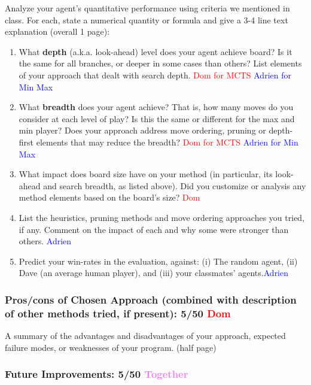 \documentclass[12pt, letterpaper]{article}
\begin{document}
        Analyze your agent's quantitative performance using  criteria we mentioned in class. For each, state a numerical quantity or formula and give a 3-4 line text explanation (overall 1 page):
        \begin{enumerate}
            \item What \textbf{depth} (a.k.a. look-ahead) level does your agent achieve  board? Is it the same for all branches, or deeper in some cases than others? List elements of your approach that dealt with search depth.  \textcolor{red}{Dom for MCTS} \textcolor{blue}{Adrien for Min Max}
            \item What \textbf{breadth} does your agent achieve? That is, how many moves do you consider at each level of play? Is this the same or different for the max and min player? Does your approach address move ordering, pruning or  depth-first elements that may reduce the breadth? \textcolor{red}{Dom for MCTS} \textcolor{blue}{Adrien for Min Max}
            \item What impact does board size have on your method (in particular, its look-ahead and search breadth, as listed above). Did you customize or analysis any method elements based on the board's size? \textcolor{red}{Dom}
            \item List the heuristics, pruning methods and move ordering approaches you tried, if any. Comment on the impact of each and why some were stronger than others. \textcolor{blue}{Adrien}
            \item Predict your win-rates in the evaluation, against: (i) The random agent, (ii) Dave (an average human player), and (iii) your classmates' agents.\textcolor{blue}{Adrien}
        \end{enumerate}
    
\subsubsection*{Pros/cons of Chosen Approach (combined with description of other methods tried, if present): 5/50 \textcolor{red}{Dom}}
    
    A summary of the advantages and disadvantages of your approach, expected failure modes, or weaknesses of your program. (half page)
    
\subsubsection*{Future Improvements: 5/50 \textcolor{violet}{Together}}
\end{document}
